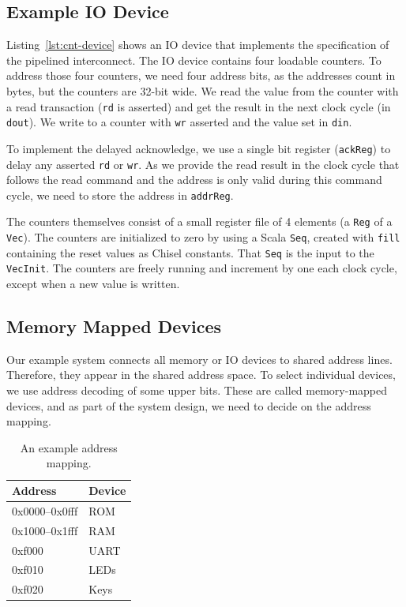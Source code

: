 \documentclass[%
    10pt,
    headinclude, footinclude=false,
    openright, %
    notitlepage,
    cleardoublepage=empty,
    headsepline,
    numbers=noenddot,
    bibliography=totoc, index=totoc,
    ]{scrbook}
\newcommand{\code}[1]{{\lstinline[basicstyle=\small\ttfamily]{#1}}}
\begin{document}
\subsection{Example IO Device}


Listing~\ref{lst:cnt-device} shows an IO device that implements the specification of the
pipelined interconnect. The IO device contains four loadable counters. To address those four
counters, we need four address bits, as the addresses count in bytes, but the counters
are 32-bit wide. We read the value from the counter with a read transaction
(\code{rd} is asserted) and get the result in the next clock cycle (in \code{dout}). We write to a counter with
\code{wr} asserted and the value set in \code{din}.

To implement the delayed acknowledge, we use a single bit register (\code{ackReg}) to
delay any asserted \code{rd} or \code{wr}. As we provide the read result in
the clock cycle that follows the read command and the address is only valid during this
command cycle, we need to store the address in \code{addrReg}.

The counters themselves consist of a small register file of 4 elements (a \code{Reg} of a \code{Vec}).
The counters are initialized to zero by using a Scala \code{Seq}, created with \code{fill}
containing the reset values as Chisel constants. That \code{Seq} is the input to the \code{VecInit}.
The counters are freely running and increment by one each clock cycle, except when 
a new value is written.

\subsection{Memory Mapped Devices}

Our example system connects all memory or IO devices to shared
address lines. Therefore, they appear in the shared address space. To select individual
devices, we use address decoding of some upper bits. These are called memory-mapped devices,
and as part of the system design, we need to decide on the address mapping.

\begin{table}
\centering
\begin{tabular}{ll}
\toprule
Address & Device \\
\midrule
0x0000--0x0fff & ROM \\
0x1000--0x1fff & RAM \\
0xf000 & UART \\
0xf010 & LEDs \\
0xf020 & Keys \\
\bottomrule
\end{tabular}
\caption{An example address mapping.}
\label{tab:addr:map}
\end{table}
\end{document}
